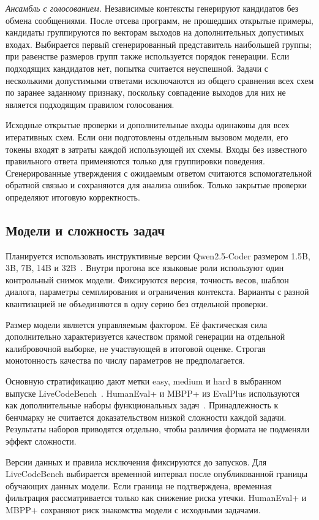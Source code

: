 \documentclass{misisarticle}
\begin{document}
\textit{Ансамбль с голосованием.} Независимые контексты генерируют кандидатов без обмена сообщениями. После отсева программ, не прошедших открытые примеры, кандидаты группируются по векторам выходов на дополнительных допустимых входах. Выбирается первый сгенерированный представитель наибольшей группы; при равенстве размеров групп также используется порядок генерации. Если подходящих кандидатов нет, попытка считается неуспешной. Задачи с несколькими допустимыми ответами исключаются из общего сравнения всех схем по заранее заданному признаку, поскольку совпадение выходов для них не является подходящим правилом голосования.

Исходные открытые проверки и дополнительные входы одинаковы для всех итеративных схем. Если они подготовлены отдельным вызовом модели, его токены входят в затраты каждой использующей их схемы. Входы без известного правильного ответа применяются только для группировки поведения. Сгенерированные утверждения с ожидаемым ответом считаются вспомогательной обратной связью и сохраняются для анализа ошибок. Только закрытые проверки определяют итоговую корректность.

\subsection{Модели и сложность задач}
Планируется использовать инструктивные версии Qwen2.5-Coder размером 1.5B, 3B, 7B, 14B и 32B~\cite{qwen}. Внутри прогона все языковые роли используют один контрольный снимок модели. Фиксируются версия, точность весов, шаблон диалога, параметры семплирования и ограничения контекста. Варианты с разной квантизацией не объединяются в одну серию без отдельной проверки.

Размер модели является управляемым фактором. Её фактическая сила дополнительно характеризуется качеством прямой генерации на отдельной калибровочной выборке, не участвующей в итоговой оценке. Строгая монотонность качества по числу параметров не предполагается.

Основную стратификацию дают метки easy, medium и hard в выбранном выпуске LiveCodeBench~\cite{livecodebench}. HumanEval+ и MBPP+ из EvalPlus используются как дополнительные наборы функциональных задач~\cite{evalplus,evalplusrepo}. Принадлежность к бенчмарку не считается доказательством низкой сложности каждой задачи. Результаты наборов приводятся отдельно, чтобы различия формата не подменяли эффект сложности.

Версии данных и правила исключения фиксируются до запусков. Для LiveCodeBench выбирается временной интервал после опубликованной границы обучающих данных модели. Если граница не подтверждена, временная фильтрация рассматривается только как снижение риска утечки. HumanEval+ и MBPP+ сохраняют риск знакомства модели с исходными задачами.
\end{document}
